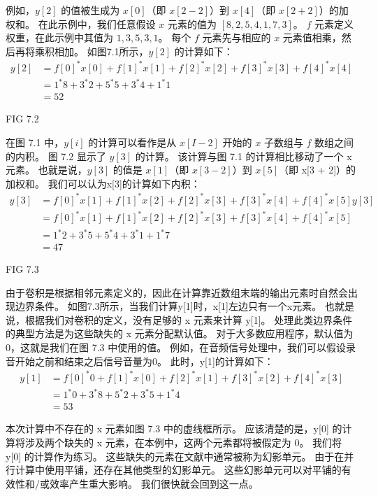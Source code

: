 例如，$y[2]$ 的值被生成为 $x[0]$（即 $x[2 - 2]$）到 $x[4]$（即 $x[2 + 2]$）的加权和。 
在此示例中，我们任意假设 $x$ 元素的值为 $[8, 2, 5, 4, 1, 7, 3]$。 
$f$ 元素定义权重，在此示例中其值为 $1, 3, 5, 3, 1$。 
每个 $f$ 元素先与相应的 $x$ 元素值相乘，然后再将乘积相加。 如图7.1所示，$y[2]$ 的计算如下：
$$
\begin{aligned}
y[2] & =f[0]^{*} x[0]+f[1]^{*} x[1]+f[2]^{*} x[2]+f[3]^{*} x[3]+f[4]^{*} x[4] \\
& =1^{*} 8+3^{*} 2+5^{*} 5+3^{*} 4+1^{*} 1 \\
& =52
\end{aligned}
$$

{\color{red} FIG 7.2}

在图 7.1 中，$y[i]$ 的计算可以看作是从 $x[I - 2]$ 开始的 $x$ 子数组与 $f$ 数组之间的内积。 
图 7.2 显示了 $y[3]$ 的计算。 该计算与图 7.1 的计算相比移动了一个 x 元素。 
也就是说，$y[3]$ 的值是 $x[1]$（即 $x[3 - 2]$）到 $x[5]$（即 x[3 + 2]）的加权和。 
我们可以认为x[3]的计算如下内积：
$$
\begin{aligned}
y[3] & =f[0]^{*} x[1]+f[1]^{*} x[2]+f[2]^{*} x[3]+f[3]^{*} x[4]+f[4]^{*} x[5] y[3] \\
& =f[0]^{*} x[1]+f[1]^{*} x[2]+f[2]^{*} x[3]+f[3]^{*} x[4]+f[4]^{*} x[5] \\
& =1^{*} 2+3^{*} 5+5^{*} 4+3^{*} 1+1^{*} 7 \\
& =47
\end{aligned}
$$

{\color{red} FIG 7.3}

由于卷积是根据相邻元素定义的，因此在计算靠近数组末端的输出元素时自然会出现边界条件。 
如图7.3所示，当我们计算y[1]时，x[1]左边只有一个x元素。 也就是说，根据我们对卷积的定义，没有足够的 x 元素来计算 y[1]。 
处理此类边界条件的典型方法是为这些缺失的 x 元素分配默认值。 
对于大多数应用程序，默认值为 0，这就是我们在图 7.3 中使用的值。 
例如，在音频信号处理中，我们可以假设录音开始之前和结束之后信号音量为0。 此时，y[1]的计算如下：
$$
\begin{aligned}
y[1] & =f[0]^{*} 0+f[1]^{*} x[0]+f[2]^{*} x[1]+f[3]^{*} x[2]+f[4]^{*} x[3] \\
& =1^{*} 0+3^{*} 8+5^{*} 2+3^{*} 5+1^{*} 4 \\
& =53
\end{aligned}
$$

本次计算中不存在的 x 元素如图 7.3 中的虚线框所示。 
应该清楚的是，y[0] 的计算将涉及两个缺失的 x 元素，在本例中，这两个元素都将被假定为 0。 
我们将 y[0] 的计算作为练习。 这些缺失的元素在文献中通常被称为幻影单元。 
由于在并行计算中使用平铺，还存在其他类型的幻影单元。 这些幻影单元可以对平铺的有效性和/或效率产生重大影响。 
我们很快就会回到这一点。

